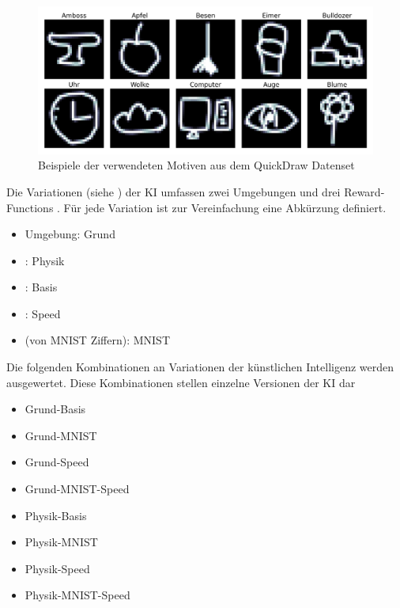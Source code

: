 \begin{figure}[!ht]
  \centering
  \includegraphics[width=\textwidth]{images/methode/quickdraw-examples.png}
  \caption{Beispiele der verwendeten Motiven aus dem QuickDraw Datenset}
  \label{fig:quickdraw-examples}
\end{figure}


Die Variationen (siehe ) der KI umfassen zwei Umgebungen und
drei Reward-Functions . Für jede Variation ist zur
Vereinfachung eine Abkürzung definiert.
\begin{itemize}
  \item {} Umgebung: Grund
  \item {}: Physik
  \item {}: Basis
  \item {}: Speed
  \item {} (von MNIST Ziffern): MNIST
\end{itemize}

Die folgenden Kombinationen an Variationen der künstlichen Intelligenz werden
ausgewertet. Diese Kombinationen stellen einzelne Versionen der KI dar
\begin{itemize}
  \item Grund-Basis
  \item Grund-MNIST
  \item Grund-Speed
  \item Grund-MNIST-Speed 
  \item Physik-Basis
  \item Physik-MNIST
  \item Physik-Speed
  \item Physik-MNIST-Speed
\end{itemize}

